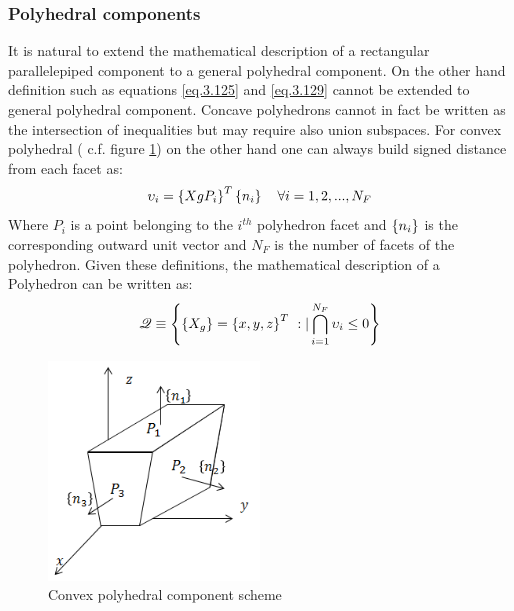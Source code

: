   \subsubsection{Polyhedral components}
  \label{ss_poly}
  It is natural to extend the mathematical description of a rectangular parallelepiped component to a general polyhedral component. On the other hand definition such as equations \eqref{eq.3.125} and \eqref{eq.3.129} cannot be extended to general polyhedral component. Concave polyhedrons cannot in fact be written as the intersection of inequalities but may require also union subspaces. For convex polyhedral ( c.f. figure \ref{fig:3.32})
   on the other hand one can always build signed distance from each facet as: 
   \begin{equation}
   \upsilon_i=\left\lbrace{XgP_i}\right \rbrace^T\left\lbrace{n_i}\right \rbrace \quad \forall i=1,2,...,N_F
   \end{equation}
   Where $P_i$ is a point belonging to the $i^{th}$ polyhedron facet and $\left\lbrace{n_i}\right \rbrace$ is the corresponding outward unit vector and $N_F$ is the number of facets of the polyhedron.  Given these definitions, the mathematical description of a Polyhedron can be written as:
   \begin{equation}
           \label{eq.3.131}
           \mathscr{Q}\equiv\VectorVar{\VectorVar{X_g}=\VectorVar{x,y,z}^T\ :| \bigcap_{i=1}^{N_F}{\upsilon_i\leq 0}}
    \end{equation} 
   \begin{figure}[!ht]
      \centering
       \includegraphics[width=0.5\textwidth]{images/Ch3/convex_polyhedral_component}
     \caption{Convex polyhedral component scheme}
     \label{fig:3.32}       %
     \end{figure}
